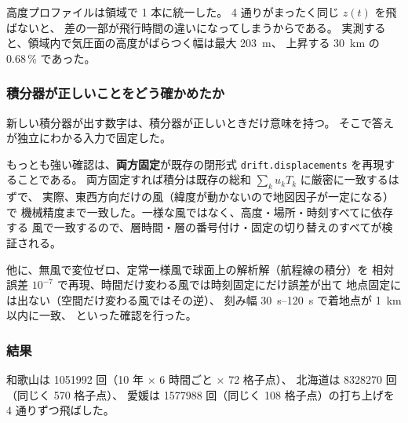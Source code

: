 高度プロファイルは領域で 1 本に統一した。
4 通りがまったく同じ $z(t)$ を飛ばないと、
差の一部が飛行時間の違いになってしまうからである。
実測すると、領域内で気圧面の高度がばらつく幅は最大 \SI{203}{\metre}、
上昇する \SI{30}{\kilo\metre} の 0.68\,\% であった。

\subsubsection{積分器が正しいことをどう確かめたか}

新しい積分器が出す数字は、積分器が正しいときだけ意味を持つ。
そこで答えが独立にわかる入力で固定した。

もっとも強い確認は、\textbf{両方固定}が既存の閉形式
\texttt{drift.displacements} を再現することである。
両方固定すれば積分は既存の総和 $\sum_k u_k T_k$ に厳密に一致するはずで、
実際、東西方向だけの風（緯度が動かないので地図因子が一定になる）で
機械精度まで一致した。一様な風ではなく、高度・場所・時刻すべてに依存する
風で一致するので、層時間・層の番号付け・固定の切り替えのすべてが検証される。

他に、無風で変位ゼロ、定常一様風で球面上の解析解（航程線の積分）を
相対誤差 $10^{-7}$ で再現、時間だけ変わる風では時刻固定にだけ誤差が出て
地点固定には出ない（空間だけ変わる風ではその逆）、
刻み幅 \SIrange{30}{120}{\second} で着地点が \SI{1}{\kilo\metre} 以内に一致、
といった確認を行った。

\subsubsection{結果}

和歌山は \num{1051992} 回（10 年 $\times$ 6 時間ごと $\times$ 72 格子点）、
北海道は \num{8328270} 回（同じく 570 格子点）、
愛媛は \num{1577988} 回（同じく 108 格子点）の打ち上げを 4 通りずつ飛ばした。

